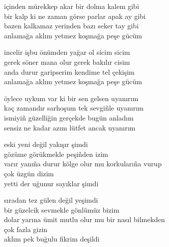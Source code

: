 \documentclass[10pt, openright, oneside]{memoir}
\theoremstyle{definition}
\begin{document}
\vspace*{\fill}
%
\newpage
{}
\vspace*{\fill}
\settowidth{\versewidth}{bir kalp ki ne zaman görse parlar apak ay gibi}
\begin{cverse}
  içinden mürekkep akar bir dolma kalem gibi \\
  bir kalp ki ne zaman görse parlar apak ay gibi \\
  bazen kalkamaz yerinden bazı seker tay gibi \\
  anlamağa aklım yetmez koşmağa peşe gücüm

  incelir işbu önümden yağar ol sicim sicim \\
  gerek söner mana olur gerek bakılır cisim \\
  anda durur garipserim kendime tel çekişim \\
  anlamağa aklım yetmez koşmağa peşe gücüm \\
\end{cverse}
\vspace*{\fill}
%
\newpage
{}
\vspace*{\fill}
\settowidth{\versewidth}{kaç zamandır sarhoşum tek sevgi\~nle uyanırım}
\begin{cverse}
  öylece uykum var ki bir sen gelsen uyanırım \\
  kaç zamandır sarhoşum tek sevgi\~nle uyanırım \\
  ismiyi\~n güzelliğin gerçekde bugün anladım \\
  sensiz ne kadar azım lütfet ancak uyanırım \\
\end{cverse}
\vspace*{\fill}
%
\newpage
{}
\vspace*{\fill}
\settowidth{\versewidth}{varır yanı\~na durur kölge olur mu korkuları\~na vurup}
\begin{cverse}
  eski yeni değil yakışır şimdi \\
  gözüme görükmekle peşi\~nden izim \\
  varır yanı\~na durur kölge olur mu korkuları\~na vurup \\
  çok üzgün dizim \\
  yetti der uğunur sayıklar şimdi

  sıradan tez gülen değil yeşimdi \\
  bir güzelcik sevmekle gönlümüz bizim \\
  dolar yarına ümit mutlu olur mu bir nasıl bilmekden \\
  çok fazla gizin \\
  aklım pek buğulu fikrim deşildi \\
\end{cverse}
\end{document}

